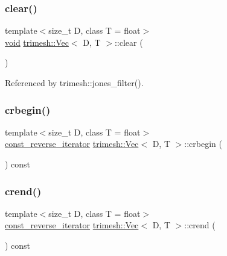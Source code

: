 \subsubsection{\texorpdfstring{clear()}{clear()}}
{\footnotesize\ttfamily template$<$size\+\_\+t D, class T = float$>$ \\
\hyperlink{namespacetrimesh_a784ddfd979e1c579bda795a8edfc3f43}{void} \hyperlink{classtrimesh_1_1Vec}{trimesh\+::\+Vec}$<$ D, T $>$\+::clear (\begin{DoxyParamCaption}{ }\end{DoxyParamCaption})\hspace{0.3cm}{\ttfamily [inline]}}



Referenced by trimesh\+::jones\+\_\+filter().

\mbox{\label{classtrimesh_1_1Vec_a1be25873280d141661ec3b79c84df7a0}} 
\subsubsection{\texorpdfstring{crbegin()}{crbegin()}}
{\footnotesize\ttfamily template$<$size\+\_\+t D, class T = float$>$ \\
\hyperlink{classtrimesh_1_1Vec_a0f78ea50431013f8f15b6286efc0dccd}{const\+\_\+reverse\+\_\+iterator} \hyperlink{classtrimesh_1_1Vec}{trimesh\+::\+Vec}$<$ D, T $>$\+::crbegin (\begin{DoxyParamCaption}{ }\end{DoxyParamCaption}) const\hspace{0.3cm}{\ttfamily [inline]}}

\mbox{\label{classtrimesh_1_1Vec_a4d64e3c76e262f365340a34429a76232}} 
\subsubsection{\texorpdfstring{crend()}{crend()}}
{\footnotesize\ttfamily template$<$size\+\_\+t D, class T = float$>$ \\
\hyperlink{classtrimesh_1_1Vec_a0f78ea50431013f8f15b6286efc0dccd}{const\+\_\+reverse\+\_\+iterator} \hyperlink{classtrimesh_1_1Vec}{trimesh\+::\+Vec}$<$ D, T $>$\+::crend (\begin{DoxyParamCaption}{ }\end{DoxyParamCaption}) const\hspace{0.3cm}{\ttfamily [inline]}}

